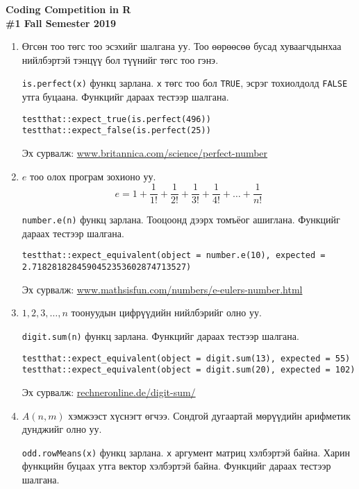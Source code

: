 \documentclass[11pt]{letter}
\begin{document}
\begin{center}
\bfseries
\Large Coding Competition in R \\
\large \#1 Fall Semester 2019
\end{center}
\begin{enumerate}
\item Өгсөн тоо төгс тоо эсэхийг шалгана уу. Тоо өөрөөсөө бусад хуваагчдынхаа нийлбэртэй тэнцүү бол түүнийг төгс тоо гэнэ.
\par
\lstinline[otherkeywords={is.perfect}]|is.perfect(x)| функц зарлана. \lstinline|x| төгс тоо бол \lstinline|TRUE|, эсрэг тохиолдолд \lstinline|FALSE| утга буцаана. Функцийг дараах тестээр шалгана.
\begin{lstlisting}[otherkeywords={is.perfect,expect_true,expect_false}]
testthat::expect_true(is.perfect(496))
testthat::expect_false(is.perfect(25))
\end{lstlisting}
Эх сурвалж: \href{https://www.britannica.com/science/perfect-number}{www.britannica.com/science/perfect-number}
\item $e$ тоо олох програм зохионо уу. $$e=1+\frac{1}{1!}+\frac{1}{2!}+\frac{1}{3!}+\frac{1}{4!}+\ldots+\frac{1}{n!}$$
\par
\lstinline[otherkeywords={number.e}]|number.e(n)| функц зарлана. Тооцоонд дээрх томъёог ашиглана. Функцийг дараах тестээр шалгана.
\begin{lstlisting}[otherkeywords={number.e,expect_equivalent}]
testthat::expect_equivalent(object = number.e(10), expected = 2.7182818284590452353602874713527)
\end{lstlisting}
Эх сурвалж: \href{https://www.mathsisfun.com/numbers/e-eulers-number.html}{www.mathsisfun.com/numbers/e-eulers-number.html}
\item $1,2,3,\ldots,n$ тоонуудын цифрүүдийн нийлбэрийг олно уу.
\par
\lstinline[otherkeywords={digit.sum}]|digit.sum(n)| функц зарлана. Функцийг дараах тестээр шалгана.
\begin{lstlisting}[otherkeywords={digit.sum,expect_equivalent}]
testthat::expect_equivalent(object = digit.sum(13), expected = 55)
testthat::expect_equivalent(object = digit.sum(20), expected = 102)
\end{lstlisting}
Эх сурвалж: \href{https://rechneronline.de/digit-sum/}{rechneronline.de/digit-sum/}
\item $A(n,m)$ хэмжээст хүснэгт өгчээ. Сондгой дугаартай мөрүүдийн арифметик дунджийг олно уу.
\par
\lstinline[otherkeywords={odd.rowMeans}]|odd.rowMeans(x)| функц зарлана. \lstinline|x| аргумент матриц хэлбэртэй байна. Харин функцийн буцаах утга вектор хэлбэртэй байна. Функцийг дараах тестээр шалгана.

\end{enumerate}
\end{document}
